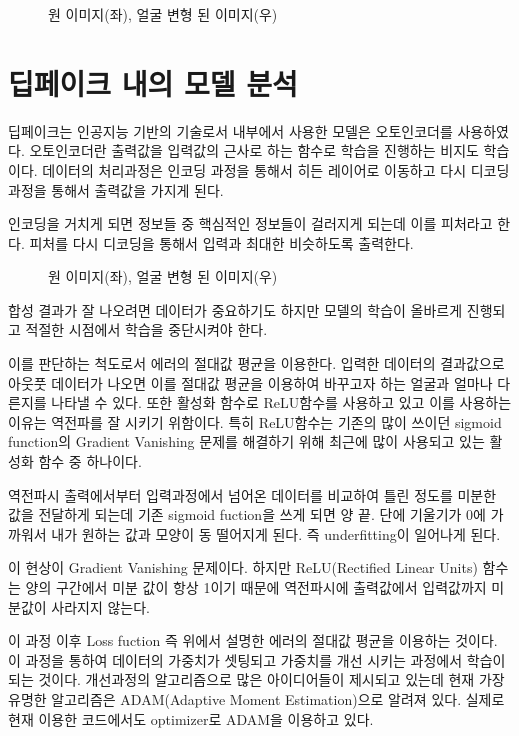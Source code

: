\documentclass{oblivoir}
\begin{document}
\begin{figure}[h!]
    \centering
\caption{원 이미지(좌), 얼굴 변형 된 이미지(우)}
\end{figure}


\section{ 딥페이크 내의 모델 분석}

딥페이크는 인공지능 기반의 기술로서 내부에서 사용한 모델은 오토인코더를 사용하였다. 오토인코더란 출력값을 입력값의 근사로 하는 함수로 학습을 진행하는 비지도 학습이다. 데이터의 처리과정은 인코딩 과정을 통해서 히든 레이어로 이동하고 다시 디코딩 과정을 통해서 출력값을 가지게 된다.

인코딩을 거치게 되면 정보들 중 핵심적인 정보들이 걸러지게 되는데 이를 피처라고 한다. 피처를 다시 디코딩을 통해서 입력과 최대한 비슷하도록 출력한다.

\begin{figure}[h!]
    \centering
\caption{원 이미지(좌), 얼굴 변형 된 이미지(우)}
\end{figure}

합성 결과가 잘 나오려면 데이터가 중요하기도 하지만 모델의 학습이 올바르게 진행되고 적절한 시점에서 학습을 중단시켜야 한다.

이를 판단하는 척도로서 에러의 절대값 평균을 이용한다. 입력한 데이터의 결과값으로 아웃풋 데이터가 나오면 이를 절대값 평균을 이용하여 바꾸고자 하는 얼굴과 얼마나 다른지를 나타낼 수 있다. 또한 활성화 함수로 ReLU함수를 사용하고 있고 이를 사용하는 이유는 역전파를 잘 시키기 위함이다. 특히 ReLU함수는 기존의 많이 쓰이던 sigmoid function의 Gradient Vanishing 문제를 해결하기 위해 최근에 많이 사용되고 있는 활성화 함수 중 하나이다.

역전파시 출력에서부터 입력과정에서 넘어온 데이터를 비교하여 틀린 정도를 미분한 값을 전달하게 되는데 기존 sigmoid fuction을 쓰게 되면 양 끝. 단에 기울기가 0에 가까워서 내가 원하는 값과 모양이 동 떨어지게 된다. 즉 underfitting이 일어나게 된다.

이 현상이 Gradient Vanishing 문제이다. 하지만 ReLU(Rectified Linear Units) 함수는 양의 구간에서 미분 값이 항상 1이기 때문에 역전파시에 출력값에서 입력값까지 미분값이 사라지지 않는다.

이 과정 이후 Loss fuction 즉 위에서 설명한 에러의 절대값 평균을 이용하는 것이다. 이 과정을 통하여 데이터의 가중치가 셋팅되고 가중치를 개선 시키는 과정에서 학습이 되는 것이다. 개선과정의 알고리즘으로 많은 아이디어들이 제시되고 있는데 현재 가장 유명한 알고리즘은 ADAM(Adaptive Moment Estimation)으로 알려져 있다. 실제로 현재 이용한 코드에서도 optimizer로 ADAM을 이용하고 있다.
\end{document}
